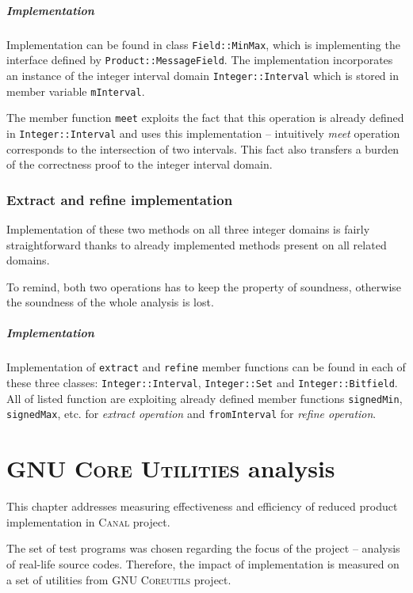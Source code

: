 \documentclass[12pt,oneside]{fithesis2}
\theoremstyle{definition}
\begin{document}
\paragraph{Implementation}
Implementation can be found in class \texttt{Field::MinMax}, which is implementing the interface defined by \texttt{Product::MessageField}. The implementation incorporates an instance of the integer interval domain \texttt{Integer::Interval} which is stored in member variable \texttt{mInterval}.

The member function \texttt{meet} exploits the fact that this operation is already defined in \texttt{Integer::Interval} and uses this implementation -- intuitively \textit{meet} operation corresponds to the intersection of two intervals. This fact also transfers a burden of the correctness proof to the integer interval domain.

\subsection{Extract and refine implementation}

Implementation of these two methods on all three integer domains is fairly straightforward thanks to already implemented methods present on all related domains.

To remind, both two operations has to keep the property of soundness, otherwise the soundness of the whole analysis is lost.

\paragraph{Implementation}
Implementation of \texttt{extract} and \texttt{refine} member functions can be found in each of these three classes: \texttt{Integer::Interval}, \texttt{Integer::Set} and \texttt{Integer::Bitfield}. All of listed function are exploiting already defined member functions \texttt{signedMin}, \texttt{signedMax}, etc. for \textit{extract operation} and \texttt{fromInterval} for \textit{refine operation}.

\chapter{\textsc{GNU Core Utilities} analysis}\label{ch:measurements}

This chapter addresses measuring effectiveness and efficiency of reduced product implementation in \textsc{Canal} project.

The set of test programs was chosen regarding the focus of the project -- analysis of real-life source codes. Therefore, the impact of implementation is measured on a set of utilities from \textsc{GNU Coreutils} project.
\end{document}
